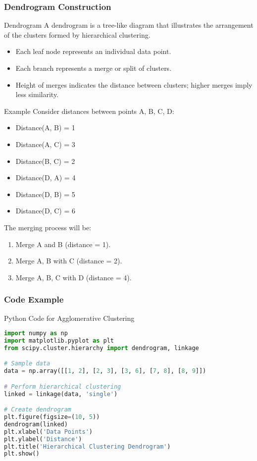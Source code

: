 \documentclass[aspectratio=169]{beamer}
\begin{document}
\begin{frame}
  \frametitle{Dendrogram Construction}
  \begin{block}{Dendrogram}
    A dendrogram is a tree-like diagram that illustrates the arrangement of the clusters formed by hierarchical clustering.
    \begin{itemize}
      \item Each leaf node represents an individual data point.
      \item Each branch represents a merge or split of clusters.
      \item Height of merges indicates the distance between clusters; higher merges imply less similarity.
    \end{itemize}
  \end{block}

  \begin{block}{Example}
    Consider distances between points A, B, C, D:
    \begin{itemize}
      \item Distance(A, B) = 1
      \item Distance(A, C) = 3
      \item Distance(B, C) = 2
      \item Distance(D, A) = 4
      \item Distance(D, B) = 5
      \item Distance(D, C) = 6
    \end{itemize}
    The merging process will be:
    \begin{enumerate}
      \item Merge A and B (distance = 1).
      \item Merge {A, B} with C (distance = 2).
      \item Merge {A, B, C} with D (distance = 4).
    \end{enumerate}
  \end{block}
\end{frame}

\begin{frame}[fragile]
  \frametitle{Code Example}
  \begin{block}{Python Code for Agglomerative Clustering}
    \begin{lstlisting}[language=Python]
import numpy as np
import matplotlib.pyplot as plt
from scipy.cluster.hierarchy import dendrogram, linkage

# Sample data
data = np.array([[1, 2], [2, 3], [3, 6], [7, 8], [8, 9]])

# Perform hierarchical clustering
linked = linkage(data, 'single')

# Create dendrogram
plt.figure(figsize=(10, 5))
dendrogram(linked)
plt.xlabel('Data Points')
plt.ylabel('Distance')
plt.title('Hierarchical Clustering Dendrogram')
plt.show()
    \end{lstlisting}
  \end{block}
\end{frame}
\end{document}
